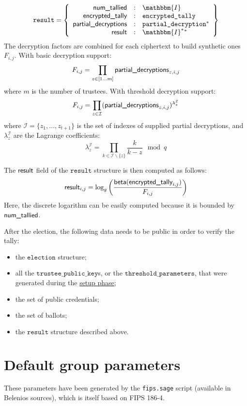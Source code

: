 \documentclass[a4paper]{article}
\newcommand{\I}{\mathbbm{I}}
\newcommand{\tpk}{\texttt{trustee\_public\_key}}
\newcommand{\election}{\texttt{election}}
\newcommand{\etally}{\texttt{encrypted\_tally}}
\newcommand{\pdecryption}{\texttt{partial\_decryption}}
\newcommand{\result}{\texttt{result}}
\begin{document}
\begin{gather*}
  \result=\left\{
    \begin{array}{rcl}
      \ntallied&:&\I\\
      \etallylabel&:&\etally\\
      \pdlabel&:&\pdecryption^\ast\\
      \resultlabel&:&\I^\ast{}^\ast
    \end{array}
  \right\}
\end{gather*}
The decryption factors are combined for each ciphertext to build
synthetic ones $F_{i,j}$. With basic decryption support:
\[
F_{i,j}=\prod_{z\in[1\dots m]}\textsf{partial\_decryptions}_{z,i,j}
\]
where $m$ is the number of trustees. With threshold decryption
support:
\[
F_{i,j}=\prod_{z\in\mathcal{I}}(\textsf{partial\_decryptions}_{z,i,j})^{\lambda_z^{\mathcal{I}}}
\]
where $\mathcal{I}=\{z_1,\dotsc,z_{t+1}\}$ is the set of indexes of
supplied partial decryptions, and $\lambda_z^{\mathcal{I}}$ are the
Lagrange coefficients:
\[
  \lambda_z^{\mathcal{I}}=\prod_{k\in\mathcal{I}\backslash\{z\}}\frac{k}{k-z}\mod q
\]

The $\textsf{result}$ field of the $\result$ structure is then computed
as follows:
\[
\textsf{result}_{i,j}=\log_g\left(\frac{\textsf{beta}(\textsf{encrypted\_tally}_{i,j})}{F_{i,j}}\right)
\]
Here, the discrete logarithm can be easily computed because it is
bounded by $\textsf{num\_tallied}$.

After the election, the following data needs to be public in order to
verify the tally:
\begin{itemize}
\item the $\election$ structure;
\item all the $\tpk$s, or the $\texttt{threshold\_parameters}$, that
  were generated during the \hyperref[election-setup]{setup phase};
\item the set of public credentials;
\item the set of ballots;
\item the $\result$ structure described above.
\end{itemize}

\section{Default group parameters}
\label{default-group}

These parameters have been generated by the \verb=fips.sage= script
(available in Belenios sources), which is itself based on FIPS 186-4.
\end{document}
